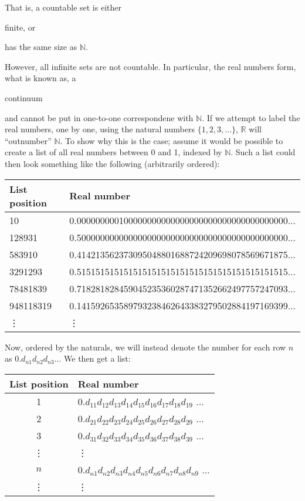 \documentclass[11pt]{article}
\theoremstyle{plain}
\theoremstyle{definition}
\newenvironment{packed_items}{
\begin{itemize}
  \setlength{\itemsep}{1pt}
  \setlength{\parskip}{0pt}
  \setlength{\parsep}{0pt}
}{\end{itemize}}
\begin{document}
\noindent That is, a countable set is either 
\begin{packed_items}
\item finite, or 
\item has the same size as $ \mathbb{N} $. 
\end{packed_items}

\noindent However, all infinite sets are not countable. In particular, the real numbers form, what is known as, a \begin{em}continuum\end{em} and cannot be put in one-to-one correspondene with $ \mathbb{N} $. If we attempt to label the real numbers, one by one, using the natural numbers $ \{ 1, 2, 3, ... \} $, $ \mathbb{R} $ will ``outnumber'' $ \mathbb{N} $. To show why this is the case; assume it would be possible to create a list of all real numbers between 0 and 1, indexed by $ \mathbb{N} $. Such a list could then look something like the following (arbitrarily ordered): 
\begin{center}
\begin{tabular}{l l}
    List position & Real number \\
    \hline 
    10 & 0.000000000100000000000000000000000000000000000... \\
    128931 & 0.500000000000000000000000000000000000000000000... \\
    583910 & 0.414213562373095048801688724209698078569671875... \\
    3291293 & 0.515151515151515151515151515151515151515151515... \\
    78481839 & 0.718281828459045235360287471352662497757247093... \\
    948118319 & 0.141592653589793238462643383279502884197169399... \\
    \vdots & \vdots
\end{tabular} 
\end{center}

\noindent Now, ordered by the naturals, we will instead denote the number for each row $ n$ as $ 0.d_{n1}d_{n2}d_{n3}... $ We then get a list: 
\begin{center}
\begin{tabular}{c l}
    List position & Real number \\
    \hline 
    1 & $ 0.d_{11}d_{12}d_{13}d_{14}d_{15}d_{16}d_{17}d_{18}d_{19} $ ... \\
    2 & $ 0.d_{21}d_{22}d_{23}d_{24}d_{25}d_{26}d_{27}d_{28}d_{29} $ ... \\
    3 & $ 0.d_{31}d_{32}d_{33}d_{34}d_{35}d_{36}d_{37}d_{38}d_{39} $ ... \\
    \vdots & \vdots \\
    $ n $ & $ 0.d_{n1}d_{n2}d_{n3}d_{n4}d_{n5}d_{n6}d_{n7}d_{n8}d_{n9} $ ... \\
    \vdots & \vdots
\end{tabular}
\end{center}
\end{document}
